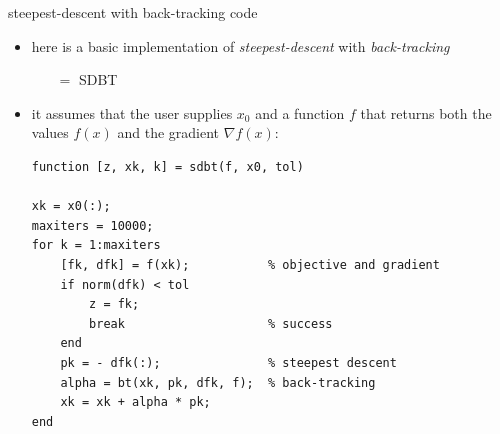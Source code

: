 \documentclass[10pt,hyperref]{beamer}
\newcommand{\grad}{\nabla}
\begin{document}
\begin{frame}[fragile]{steepest-descent with back-tracking code}

\begin{itemize}
\item here is a basic implementation of \emph{steepest-descent} with \emph{back-tracking}
    \begin{itemize}
    \item[$=$] SDBT
    \end{itemize}
\item it assumes that the user supplies $x_0$ and a function $f$ that returns both the values $f(x)$ and the gradient $\grad f(x)$:

\medskip
\begin{Verbatim}[fontsize=\small]
function [z, xk, k] = sdbt(f, x0, tol)

xk = x0(:);
maxiters = 10000;
for k = 1:maxiters
    [fk, dfk] = f(xk);           % objective and gradient
    if norm(dfk) < tol
        z = fk;
        break                    % success
    end
    pk = - dfk(:);               % steepest descent
    alpha = bt(xk, pk, dfk, f);  % back-tracking
    xk = xk + alpha * pk;
end
\end{Verbatim}
\end{itemize}
\end{frame}
\end{document}
